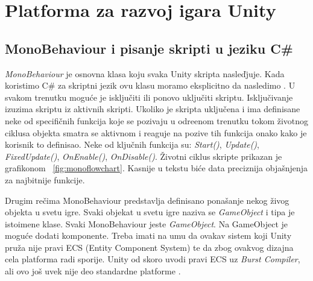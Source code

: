 \clearpage
\section{Platforma za razvoj igara Unity}

\subsection{MonoBehaviour i pisanje skripti u jeziku C\#}

\emph{MonoBehaviour} je osnovna klasa koju svaka Unity skripta nasle\v{dj}uje. Kada
koristimo C\# za skriptni jezik ovu klasu moramo eksplicitno da nasledimo \cite{unitydocs}. U svakom trenutku
mogu\'ce je isklju\v{c}iti ili ponovo uklju\v{c}iti skriptu. Isklju\v{c}ivanje
izuzima skriptu iz aktivnih skripti. Ukoliko je skripta uklju\v{c}ena i ima definisane
neke od specifi\v{c}nih funkcija koje se pozivaju u odre\dj enom trenutku tokom
\v{z}ivotnog ciklusa objekta smatra se aktivnom i reaguje na pozive tih funkcija
onako kako je korisnik to definisao. Neke od klju\v{c}nih funkcija su: \emph{Start()}, \emph{Update()},
\emph{FixedUpdate()}, \emph{OnEnable()}, \emph{OnDisable()}. \v{Z}ivotni ciklus skripte prikazan
je grafikonom ~\ref{fig:monoflowchart}. Kasnije u tekstu bi\'ce data preciznija obja\v{s}njenja
za najbitnije funkcije.

Drugim re\v{c}ima MonoBehaviour predstavlja definisano pona\v{s}anje nekog \v{z}ivog objekta
u svetu igre. Svaki objekat u svetu igre naziva se \emph{GameObject} i tipa je istoimene klase. Svaki
MonoBehaviour jeste \emph{GameObject}. Na GameObject je mogu\'ce dodati komponente. Treba imati 
na umu da ovakav sistem koji Unity pru\v{z}a nije pravi ECS (Entity Component System) te da zbog ovakvog
dizajna cela platforma radi sporije. Unity od skoro uvodi pravi ECS uz \emph{Burst Compiler}, ali ovo jo\v{s} uvek 
nije deo standardne platforme \cite{unitydocs}.

